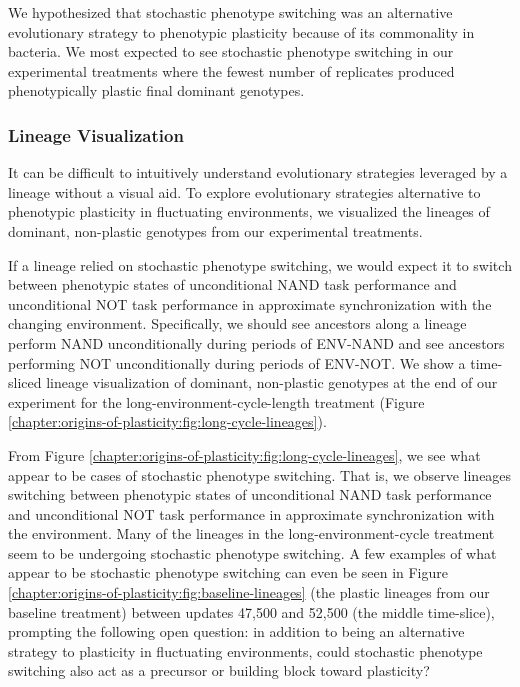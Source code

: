 We hypothesized that stochastic phenotype switching was an alternative evolutionary strategy to phenotypic plasticity because of its commonality in bacteria. 
We most expected to see stochastic phenotype switching in our experimental treatments where the fewest number of replicates produced phenotypically plastic final dominant genotypes. 

\vspace{0.25\baselineskip}
\subsubsection{Lineage Visualization}

It can be difficult to intuitively understand evolutionary strategies leveraged by a lineage without a visual aid.
To explore evolutionary strategies alternative to phenotypic plasticity in fluctuating environments, we visualized the lineages of dominant, non-plastic genotypes from our experimental treatments. 



If a lineage relied on stochastic phenotype switching, we would expect it to switch between phenotypic states of unconditional NAND task performance and unconditional NOT task performance in approximate synchronization with the changing environment. 
Specifically, we should see ancestors along a lineage perform NAND unconditionally during periods of ENV-NAND and see ancestors performing NOT unconditionally during periods of ENV-NOT. 
We show a time-sliced lineage visualization of dominant, non-plastic genotypes at the end of our experiment for the long-environment-cycle-length treatment (Figure \ref{chapter:origins-of-plasticity:fig:long-cycle-lineages}).  

From Figure \ref{chapter:origins-of-plasticity:fig:long-cycle-lineages}, we see what appear to be cases of stochastic phenotype switching.
That is, we observe lineages switching between phenotypic states of unconditional NAND task performance and unconditional NOT task performance in approximate synchronization with the environment. 
Many of the lineages in the long-environment-cycle treatment seem to be undergoing stochastic phenotype switching. 
A few examples of what appear to be stochastic phenotype switching can even be seen in Figure \ref{chapter:origins-of-plasticity:fig:baseline-lineages} (the plastic lineages from our baseline treatment) between updates 47,500 and 52,500 (the middle time-slice), prompting the following open question: in addition to being an alternative strategy to plasticity in fluctuating environments, could stochastic phenotype switching also act as a precursor or building block toward plasticity? 

